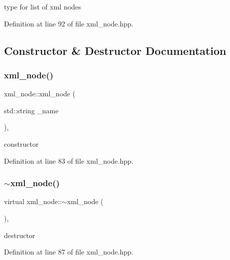 type for list of xml nodes 



Definition at line 92 of file xml\+\_\+node.\+hpp.



\subsection{Constructor \& Destructor Documentation}
\mbox{\label{classxml__node_a4de8545189dbe740668066872579d9d3}} 
\subsubsection{\texorpdfstring{xml\+\_\+node()}{xml\_node()}}
{\footnotesize\ttfamily xml\+\_\+node\+::xml\+\_\+node (\begin{DoxyParamCaption}\item[{std\+::string}]{\+\_\+name }\end{DoxyParamCaption})\hspace{0.3cm}{\ttfamily [inline]}, {\ttfamily [explicit]}}



constructor 



Definition at line 83 of file xml\+\_\+node.\+hpp.

\mbox{\label{classxml__node_a9cf087ddb4d9b7d86a120504d62a56d4}} 
\subsubsection{\texorpdfstring{$\sim$xml\+\_\+node()}{~xml\_node()}}
{\footnotesize\ttfamily virtual xml\+\_\+node\+::$\sim$xml\+\_\+node (\begin{DoxyParamCaption}{ }\end{DoxyParamCaption})\hspace{0.3cm}{\ttfamily [inline]}, {\ttfamily [virtual]}}



destructor 



Definition at line 87 of file xml\+\_\+node.\+hpp.



